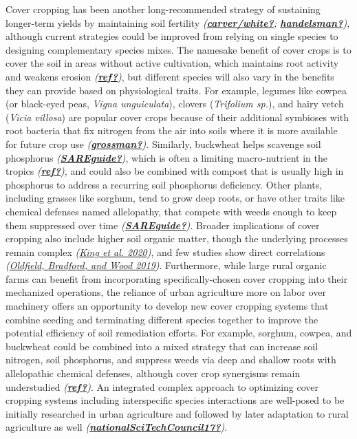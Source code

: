 \documentclass[
]{article}
\begin{document}
\hfill\break

Cover cropping has been another long-recommended strategy of sustaining longer-term yields by maintaining soil fertility \emph{(\protect\hyperlink{ref-carverux2fwhite}{\textbf{carver/white?}}; \protect\hyperlink{ref-handelsman}{\textbf{handelsman?}})}, although current strategies could be improved from relying on single species to designing complementary species mixes.
The namesake benefit of cover crops is to cover the soil in areas without active cultivation, which maintains root activity and weakens erosion \emph{(\protect\hyperlink{ref-ref}{\textbf{ref?}})}, but different species will also vary in the benefits they can provide based on physiological traits.
For example, legumes like cowpea (or black-eyed peas, \emph{Vigna unguiculata}), clovers (\emph{Trifolium sp.}), and hairy vetch (\emph{Vicia villosa}) are popular cover crops because of their additional symbioses with root bacteria that fix nitrogen from the air into soils where it is more available for future crop use \emph{(\protect\hyperlink{ref-grossman}{\textbf{grossman?}})}.
Similarly, buckwheat helps scavenge soil phosphorus \emph{(\protect\hyperlink{ref-SAREguide}{\textbf{SAREguide?}})}, which is often a limiting macro-nutrient in the tropics \emph{(\protect\hyperlink{ref-ref}{\textbf{ref?}})}, and could also be combined with compost that is usually high in phosphorus to address a recurring soil phosphorus deficiency.
Other plants, including grasses like sorghum, tend to grow deep roots, or have other traits like chemical defenses named allelopathy, that compete with weeds enough to keep them suppressed over time \emph{(\protect\hyperlink{ref-SAREguide}{\textbf{SAREguide?}})}.
Broader implications of cover cropping also include higher soil organic matter, though the underlying processes remain complex \emph{(\protect\hyperlink{ref-king20}{King et al. 2020})}, and few studies show direct correlations \emph{(\protect\hyperlink{ref-oldfield19}{Oldfield, Bradford, and Wood 2019})}.
Furthermore, while large rural organic farms can benefit from incorporating specifically-chosen cover cropping into their mechanized operations, the reliance of urban agriculture more on labor over machinery offers an opportunity to develop new cover cropping systems that combine seeding and terminating different species together to improve the potential efficiency of soil remediation efforts.
For example, sorghum, cowpea, and buckwheat could be combined into a mixed strategy that can increase soil nitrogen, soil phosphorus, and suppress weeds via deep and shallow roots with allelopathic chemical defenses, although cover crop synergisms remain understudied \emph{(\protect\hyperlink{ref-ref}{\textbf{ref?}})}.
An integrated complex approach to optimizing cover cropping systems including interspecific species interactions are well-posed to be initially researched in urban agriculture and followed by later adaptation to rural agriculture as well \emph{(\protect\hyperlink{ref-nationalSciTechCouncil17}{\textbf{nationalSciTechCouncil17?}})}.
\end{document}
